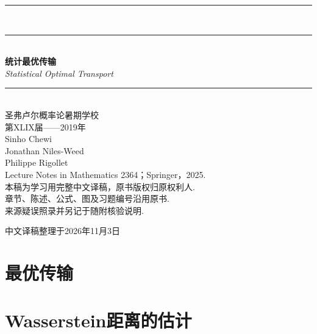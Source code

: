 \documentclass[UTF8,12pt]{ctexart}
\theoremstyle{plain}
\numberwithin{equation}{section}
\numberwithin{figure}{section}
\begin{document}
\hypersetup{pageanchor=false}
\begin{titlepage}
\flushleft
\rule{\textwidth}{1.2pt}\\[0.1cm]
\rule{\textwidth}{0.8pt}\\[1.4cm]
{\fontsize{40pt}{52pt}\selectfont\bfseries 统计最优传输}\\[0.8cm]
{\fontsize{22pt}{30pt}\selectfont\textit{Statistical Optimal Transport}}\\[1.0cm]
\rule{\textwidth}{0.6pt}\\[1.0cm]
{\Large 圣弗卢尔概率论暑期学校\\[0.3cm]第XLIX届——2019年}\\[1cm]
{\large Sinho Chewi\\[0.15cm]Jonathan Niles-Weed\\[0.15cm]Philippe Rigollet}\\[1.2cm]
{\small Lecture Notes in Mathematics 2364；Springer，2025.\\
本稿为学习用完整中文译稿，原书版权归原权利人.\\
章节、陈述、公式、图及习题编号沿用原书.\\
来源疑误照录并另记于随附核验说明.}
\vfill
\begin{flushright}{\small 中文译稿整理于2026年11月3日}\end{flushright}
\end{titlepage}
\hypersetup{pageanchor=true}




\begingroup{}

\endgroup
\clearpage\tableofcontents\clearpage
{}
\section{最优传输}\label{sec:1}








\section{Wasserstein距离的估计}\label{sec:2}










\end{document}
